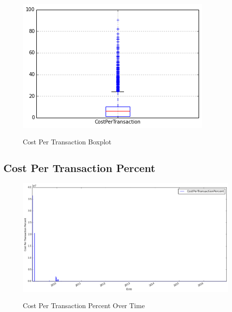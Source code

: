 \begin{figure}[bth]
  \myfloatalign
  {\includegraphics[width=1\linewidth]
    {gfx/cost-per-transaction-boxplot}}
  \caption{Cost Per Transaction Boxplot}
  \label{fig:cost-per-transaction-boxplot}
\end{figure}

\clearpage

\subsection{Cost Per Transaction Percent}
\label{sec:cost-per-transaction-percent}

\begin{figure}[bth]
  \myfloatalign
  {\includegraphics[width=1\linewidth]
    {gfx/cost-per-transaction-percent-over-time}}
  \caption{Cost Per Transaction Percent Over Time}
  \label{fig:cost-per-transaction-percent-over-time}
\end{figure}

